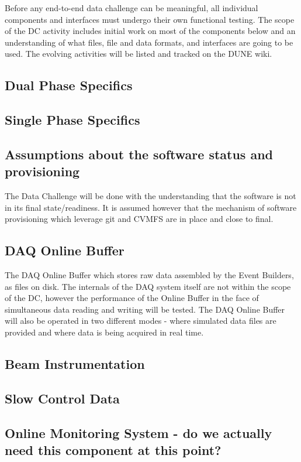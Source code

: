 \documentclass[pdftex,12pt,letter]{article}
\begin{document}
Before any end-to-end data challenge can be meaningful, all individual components and interfaces must undergo
their own functional testing. The scope of the DC activity includes initial work on most of the components below and an
understanding of what files, file and data formats, and interfaces are going to be used. The evolving activities will be listed and tracked on the DUNE wiki. 

\subsection{Dual Phase Specifics}
\subsection{Single Phase Specifics}

\subsection{Assumptions about the software status and provisioning}
The Data Challenge will be done with the understanding that the software is not in its final state/readiness. It is assumed
however that the mechanism of software provisioning which leverage git and  CVMFS are in place and close to final.

\subsection{DAQ Online Buffer}
The DAQ Online Buffer which stores raw data assembled by the Event Builders, as files on disk. The internals
of the DAQ system itself are not within the scope of the DC, however the performance of the Online Buffer in the face of simultaneous data reading and writing will be tested. The DAQ Online Buffer will also be operated in two different modes - where simulated data files are provided and where data is being acquired in real time.

\subsection{Beam Instrumentation} 

\subsection{Slow Control Data}

\subsection{Online Monitoring System - do we actually need this component at this point?}
 
\end{document}

